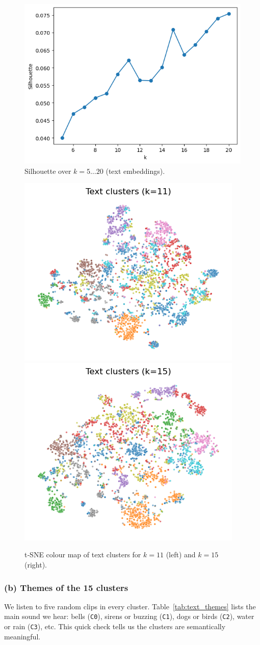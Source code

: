 \documentclass[runningheads]{llncs}
\begin{document}
\begin{figure}[h]
  \centering
  \includegraphics[width=.55\linewidth]{figs_tang/04_silhouette_k.png}
  \caption{Silhouette over $k=5\ldots20$ (text embeddings).}
  \label{fig:text_silhouette}
\end{figure}

\begin{figure}[h]
  \centering
  \includegraphics[width=.45\linewidth]{figs_tang/04_text_cluster11.png}\hfill
  \includegraphics[width=.45\linewidth]{figs_tang/04_text_cluster15.png}
  \caption{t‑SNE colour map of text clusters for $k=11$ (left) and $k=15$ (right).}
  \label{fig:text_tsne}
\end{figure}

\subsubsection{(b) Themes of the 15 clusters}
We listen to five random clips in every cluster. Table~\ref{tab:text_themes} lists the main sound we hear: bells (\texttt{C0}), sirens or buzzing (\texttt{C1}), dogs or birds (\texttt{C2}), water or rain (\texttt{C3}), etc. This quick check tells us the clusters are semantically meaningful.
\end{document}
